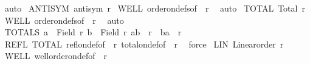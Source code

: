 \begin{isabellebody}
\ auto%
\endisatagproof
{\isafoldproof}%
%
\isadelimproof
\isanewline
%
\endisadelimproof
\isanewline
{}\isamarkupfalse%
\ ANTISYM{\isacharcolon}{\kern0pt}\ {\isachardoublequoteopen}antisym\ r{\isachardoublequoteclose}\isanewline
%
\isadelimproof
%
\endisadelimproof
%
\isatagproof
{}\isamarkupfalse%
\ WELL\ order{\isacharunderscore}{\kern0pt}on{\isacharunderscore}{\kern0pt}defs{\isacharbrackleft}{\kern0pt}of\ {\isacharunderscore}{\kern0pt}\ r{\isacharbrackright}{\kern0pt}\ \isamarkupfalse%
\ auto%
\endisatagproof
{\isafoldproof}%
%
\isadelimproof
\isanewline
%
\endisadelimproof
\isanewline
{}\isamarkupfalse%
\ TOTAL{\isacharcolon}{\kern0pt}\ {\isachardoublequoteopen}Total\ r{\isachardoublequoteclose}\isanewline
%
\isadelimproof
%
\endisadelimproof
%
\isatagproof
{}\isamarkupfalse%
\ WELL\ order{\isacharunderscore}{\kern0pt}on{\isacharunderscore}{\kern0pt}defs{\isacharbrackleft}{\kern0pt}of\ {\isacharunderscore}{\kern0pt}\ r{\isacharbrackright}{\kern0pt}\ \isamarkupfalse%
\ auto%
\endisatagproof
{\isafoldproof}%
%
\isadelimproof
\isanewline
%
\endisadelimproof
\isanewline
{}\isamarkupfalse%
\ TOTALS{\isacharcolon}{\kern0pt}\ {\isachardoublequoteopen}{\isasymforall}a\ {\isasymin}\ Field\ r{\isachardot}{\kern0pt}\ {\isasymforall}b\ {\isasymin}\ Field\ r{\isachardot}{\kern0pt}\ {\isacharparenleft}{\kern0pt}a{\isacharcomma}{\kern0pt}b{\isacharparenright}{\kern0pt}\ {\isasymin}\ r\ {\isasymor}\ {\isacharparenleft}{\kern0pt}b{\isacharcomma}{\kern0pt}a{\isacharparenright}{\kern0pt}\ {\isasymin}\ r{\isachardoublequoteclose}\isanewline
%
\isadelimproof
%
\endisadelimproof
%
\isatagproof
{}\isamarkupfalse%
\ REFL\ TOTAL\ refl{\isacharunderscore}{\kern0pt}on{\isacharunderscore}{\kern0pt}def{\isacharbrackleft}{\kern0pt}of\ {\isacharunderscore}{\kern0pt}\ r{\isacharbrackright}{\kern0pt}\ total{\isacharunderscore}{\kern0pt}on{\isacharunderscore}{\kern0pt}def{\isacharbrackleft}{\kern0pt}of\ {\isacharunderscore}{\kern0pt}\ r{\isacharbrackright}{\kern0pt}\ \isamarkupfalse%
\ force%
\endisatagproof
{\isafoldproof}%
%
\isadelimproof
\isanewline
%
\endisadelimproof
\isanewline
{}\isamarkupfalse%
\ LIN{\isacharcolon}{\kern0pt}\ {\isachardoublequoteopen}Linear{\isacharunderscore}{\kern0pt}order\ r{\isachardoublequoteclose}\isanewline
%
\isadelimproof
%
\endisadelimproof
%
\isatagproof
{}\isamarkupfalse%
\ WELL\ well{\isacharunderscore}{\kern0pt}order{\isacharunderscore}{\kern0pt}on{\isacharunderscore}{\kern0pt}def{\isacharbrackleft}{\kern0pt}of\ {\isacharunderscore}{\kern0pt}\ r{\isacharbrackright}{\kern0pt}\ \isamarkupfalse%

\end{isabellebody}
